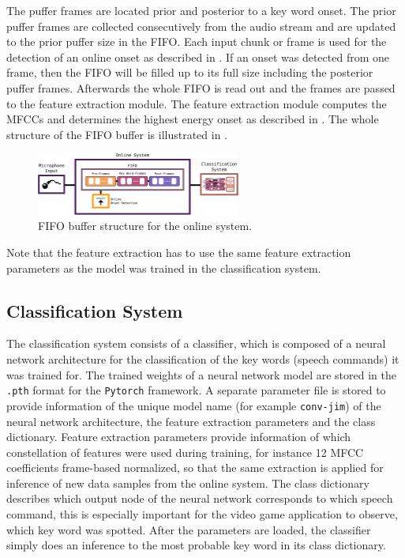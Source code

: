 The puffer frames are located prior and posterior to a key word onset.
The prior puffer frames are collected consecutively from the audio stream and are updated to the prior puffer size in the FIFO. 
Each input chunk or frame is used for the detection of an online onset as described in .
If an onset was detected from one frame, then the FIFO will be filled up to its full size including the posterior puffer frames.
Afterwards the whole FIFO is read out and the frames are passed to the feature extraction module.
The feature extraction module computes the MFCCs and determines the highest energy onset as described in .
The whole structure of the FIFO buffer is illustrated in .
\begin{figure}[!ht]
  \centering
  \includegraphics[width=0.60\textwidth]{./6_game/figs/game_system_online}
  \caption{FIFO buffer structure for the online system.}
  \label{fig:game_system_online}
\end{figure}
\FloatBarrier
\noindent
Note that the feature extraction has to use the same feature extraction parameters as the model was trained in the classification system.



\subsection{Classification System}
The classification system consists of a classifier, which is composed of a neural network architecture for the classification of the key words (speech commands) it was trained for.
The trained weights of a neural network model are stored in the \texttt{.pth} format for the \texttt{Pytorch} framework.
A separate parameter file is stored to provide information of the unique model name (for example \texttt{conv-jim}) of the neural network architecture, the feature extraction parameters and the class dictionary.
Feature extraction parameters provide information of which constellation of features were used during training, for instance 12 MFCC coefficients frame-based normalized, so that the same extraction is applied for inference of new data samples from the online system.
The class dictionary describes which output node of the neural network corresponds to which speech command, this is especially important for the video game application to observe, which key word was spotted.
After the parameters are loaded, the classifier simply does an inference to the most probable key word in its class dictionary.

